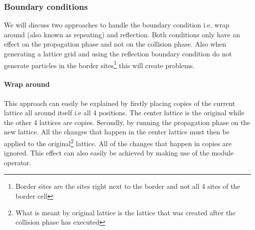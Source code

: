 \documentclass[a4paper,12pt]{article}
\begin{document}
\subsubsection{Boundary conditions}
We will discuss two approaches to handle the boundary condition i.e. wrap around (also known as repeating) and reflection. Both conditions only have an effect on the propagation phase and not on the collision phase. Also when generating a lattice grid and using the reflection boundary condition do not generate particles in the border sites\footnote{Border sites are the sites right next to the border and not all 4 sites of the border cell} this will create problems.
\paragraph{Wrap around}
This approach can easily be explained by firstly placing copies of the current lattice all around itself i.e all 4 positions. The center lattice is the original while the other 4 lattices are copies.
Secondly, by running the propagation phase on the new lattice. All the changes that happen in the center lattice must then be applied to the original\footnote{What is meant by original lattice is the lattice that was created after the collision phase has executed} lattice. All of the changes that happen in copies are ignored. This effect can also easily be achieved by making use of the module operator.
\end{document}
